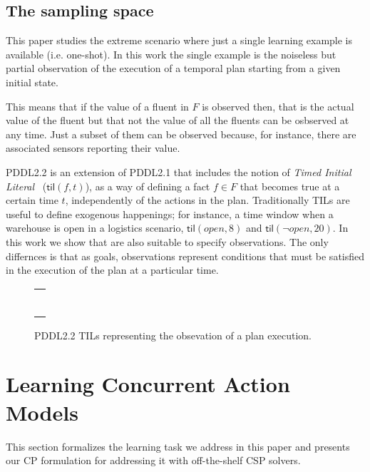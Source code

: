 \documentclass{ecai}
\newcommand{\til}{\mathsf{til}}    %
\begin{document}
\subsection{The sampling space}
\label{sec:sampling-space}
This paper studies the extreme scenario where just a single learning example is available (i.e. one-shot). In this work the single example is the noiseless but partial observation of the execution of a temporal plan starting from a given initial state.

This means that if the value of a fluent in $F$ is observed then, that is the actual value of the fluent but that not the value of all the fluents can be osbserved at any time. Just a subset of them can be observed because, for instance, there are associated sensors reporting their value.

PDDL2.2 is an extension of PDDL2.1 that includes the notion of {\em Timed Initial Literal}~\cite{hoffmann2005} ($\til(f,t)$), as a way of defining a fact $f\in F$ that becomes true at a certain time $t$, independently of the actions in the plan. Traditionally TILs are useful to define exogenous happenings; for instance, a time window when a warehouse is open in a logistics scenario, $\til(open,8)$ and $\til(\neg open,20)$. In this work we show that are also suitable to specify observations. The only differnces is that as goals, observations represent conditions that must be satisfied in the execution of the plan at a particular time.

\begin{figure}
  \begin{tabular}{p{\textwidth}}
\begin{tiny}    
\begin{verbatim}

\end{verbatim}
\end{tiny}    
\end{tabular}
\caption{\small PDDL2.2 TILs representing the obsevation of a plan execution.}
\label{fig:exampletils}
\end{figure}



\section{Learning Concurrent Action Models}
This section formalizes the learning task we address in this paper and presents our CP formulation for addressing it with off-the-shelf CSP solvers.
\end{document}
